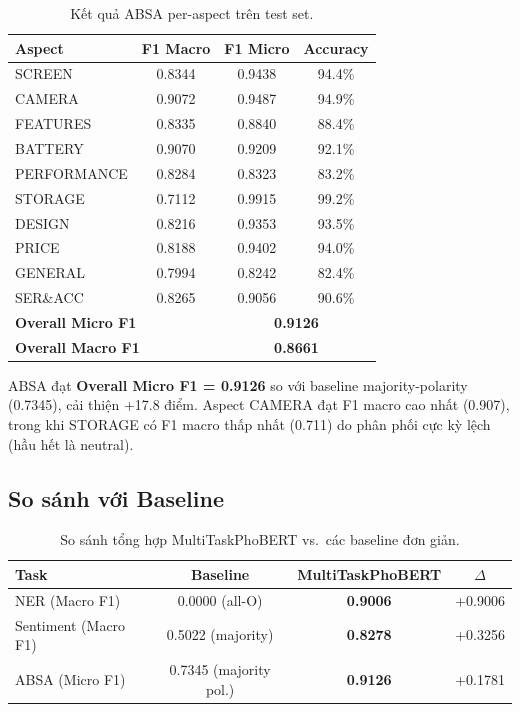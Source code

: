 \begin{table}[H]
\centering
\caption{Kết quả ABSA per-aspect trên test set.}
\label{tab:absa_results}
\begin{tabular}{lccc}
\toprule
\textbf{Aspect} & \textbf{F1 Macro} & \textbf{F1 Micro} & \textbf{Accuracy} \\
\midrule
SCREEN      & 0.8344 & 0.9438 & 94.4\% \\
CAMERA      & 0.9072 & 0.9487 & 94.9\% \\
FEATURES    & 0.8335 & 0.8840 & 88.4\% \\
BATTERY     & 0.9070 & 0.9209 & 92.1\% \\
PERFORMANCE & 0.8284 & 0.8323 & 83.2\% \\
STORAGE     & 0.7112 & 0.9915 & 99.2\% \\
DESIGN      & 0.8216 & 0.9353 & 93.5\% \\
PRICE       & 0.8188 & 0.9402 & 94.0\% \\
GENERAL     & 0.7994 & 0.8242 & 82.4\% \\
SER\&ACC    & 0.8265 & 0.9056 & 90.6\% \\
\midrule
\multicolumn{2}{l}{\textbf{Overall Micro F1}} & \multicolumn{2}{c}{\textbf{0.9126}} \\
\multicolumn{2}{l}{\textbf{Overall Macro F1}} & \multicolumn{2}{c}{\textbf{0.8661}} \\
\bottomrule
\end{tabular}
\end{table}

ABSA đạt \textbf{Overall Micro F1 = 0.9126} so với baseline majority-polarity (0.7345), cải thiện +17.8 điểm.
Aspect CAMERA đạt F1 macro cao nhất (0.907), trong khi STORAGE có F1 macro thấp nhất (0.711)
do phân phối cực kỳ lệch (hầu hết là neutral).

\subsection{So sánh với Baseline}

\begin{table}[H]
\centering
\caption{So sánh tổng hợp MultiTaskPhoBERT vs.\ các baseline đơn giản.}
\label{tab:comparison}
\begin{tabular}{lccc}
\toprule
\textbf{Task} & \textbf{Baseline} & \textbf{MultiTaskPhoBERT} & \textbf{$\Delta$} \\
\midrule
NER (Macro F1)         & 0.0000 (all-O) & \textbf{0.9006} & +0.9006 \\
Sentiment (Macro F1)   & 0.5022 (majority) & \textbf{0.8278} & +0.3256 \\
ABSA (Micro F1)        & 0.7345 (majority pol.) & \textbf{0.9126} & +0.1781 \\
\bottomrule
\end{tabular}
\end{table}

